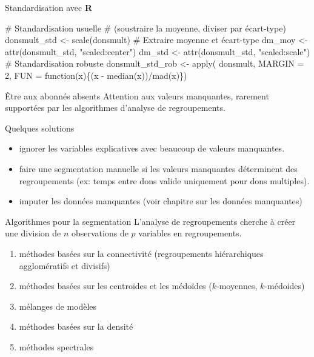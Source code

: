 \documentclass[
  ignorenonframetext,
]{beamer}
\newenvironment{Shaded}{\begin{snugshade}}{\end{snugshade}}
\newcommand{\AttributeTok}[1]{\textcolor[rgb]{0.40,0.45,0.13}{#1}}
\newcommand{\CommentTok}[1]{\textcolor[rgb]{0.37,0.37,0.37}{#1}}
\newcommand{\ControlFlowTok}[1]{\textcolor[rgb]{0.00,0.23,0.31}{#1}}
\newcommand{\DecValTok}[1]{\textcolor[rgb]{0.68,0.00,0.00}{#1}}
\newcommand{\FunctionTok}[1]{\textcolor[rgb]{0.28,0.35,0.67}{#1}}
\newcommand{\NormalTok}[1]{\textcolor[rgb]{0.00,0.23,0.31}{#1}}
\newcommand{\OtherTok}[1]{\textcolor[rgb]{0.00,0.23,0.31}{#1}}
\newcommand{\SpecialCharTok}[1]{\textcolor[rgb]{0.37,0.37,0.37}{#1}}
\newcommand{\StringTok}[1]{\textcolor[rgb]{0.13,0.47,0.30}{#1}}
\providecommand{\tightlist}{%
  \setlength{\itemsep}{0pt}\setlength{\parskip}{0pt}}\usepackage{longtable,booktabs,array}
\begin{document}
\begin{frame}[fragile]{Standardisation avec \textbf{R}}
\protect\hypertarget{standardisation-avec-r}{}
\begin{Shaded}
\begin{Highlighting}[numbers=left,,]
\CommentTok{\# Standardisation usuelle}
\CommentTok{\# (soustraire la moyenne, diviser par écart{-}type)}
\NormalTok{donsmult\_std }\OtherTok{\textless{}{-}} \FunctionTok{scale}\NormalTok{(donsmult)}
\CommentTok{\# Extraire moyenne et écart{-}type}
\NormalTok{dm\_moy }\OtherTok{\textless{}{-}} \FunctionTok{attr}\NormalTok{(donsmult\_std, }\StringTok{"scaled:center"}\NormalTok{)}
\NormalTok{dm\_std }\OtherTok{\textless{}{-}} \FunctionTok{attr}\NormalTok{(donsmult\_std, }\StringTok{"scaled:scale"}\NormalTok{)}
\CommentTok{\# Standardisation robuste}
\NormalTok{donsmult\_std\_rob }\OtherTok{\textless{}{-}} \FunctionTok{apply}\NormalTok{(}
\NormalTok{  donsmult,}
  \AttributeTok{MARGIN =} \DecValTok{2}\NormalTok{,}
  \AttributeTok{FUN =} \ControlFlowTok{function}\NormalTok{(x)\{(x }\SpecialCharTok{{-}} \FunctionTok{median}\NormalTok{(x))}\SpecialCharTok{/}\FunctionTok{mad}\NormalTok{(x)\})}
\end{Highlighting}
\end{Shaded}
\end{frame}

\begin{frame}{Être aux abonnés absents}
\protect\hypertarget{uxeatre-aux-abonnuxe9s-absents}{}
Attention aux valeurs manquantes, rarement supportées par les
algorithmes d'analyse de regroupements.

Quelques solutions

\begin{itemize}
\tightlist
\item
  ignorer les variables explicatives avec beaucoup de valeurs
  manquantes.
\item
  faire une segmentation manuelle si les valeurs manquantes déterminent
  des regroupements (ex: temps entre dons valide uniquement pour dons
  multiples).
\item
  imputer les données manquantes (voir chapitre sur les données
  manquantes)
\end{itemize}
\end{frame}

\begin{frame}{Algorithmes pour la segmentation}
\protect\hypertarget{algorithmes-pour-la-segmentation}{}
L'analyse de regroupements cherche à créer une division de \(n\)
observations de \(p\) variables en regroupements.

\begin{enumerate}
\tightlist
\item
  méthodes basées sur la connectivité (regroupements hiérarchiques
  agglomératifs et divisifs)
\item
  méthodes basées sur les centroïdes et les médoïdes (\(k\)-moyennes,
  \(k\)-médoides)
\item
  mélanges de modèles
\item
  méthodes basées sur la densité
\item
  méthodes spectrales
\end{enumerate}
\end{frame}
\end{document}
